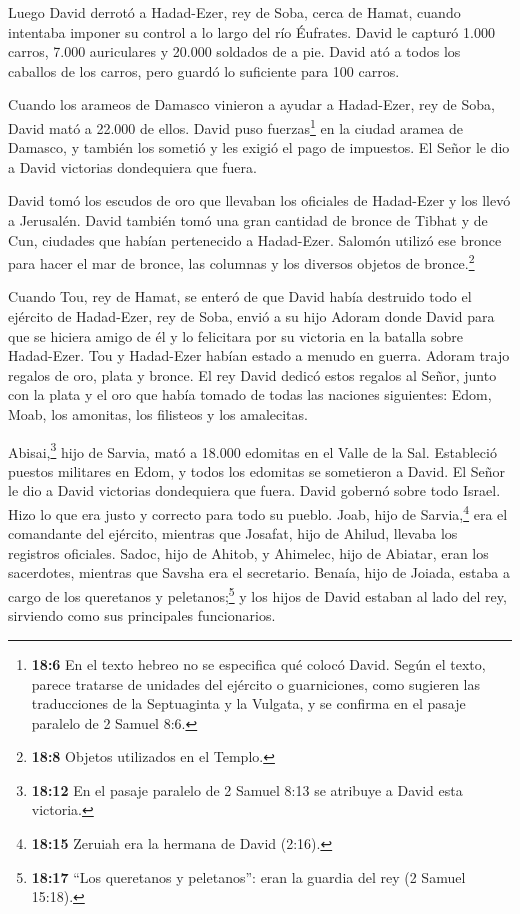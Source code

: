  Luego David derrotó a Hadad-Ezer, rey de Soba, cerca de
Hamat, cuando intentaba imponer su control a lo largo del río Éufrates.
 David le capturó 1.000 carros, 7.000 auriculares y 20.000
soldados de a pie. David ató a todos los caballos de los carros, pero
guardó lo suficiente para 100 carros.

 Cuando los arameos de Damasco vinieron a ayudar a
Hadad-Ezer, rey de Soba, David mató a 22.000 de ellos. 
David puso fuerzas\footnote{\textbf{18:6} En el texto hebreo no se
  especifica qué colocó David. Según el texto, parece tratarse de
  unidades del ejército o guarniciones, como sugieren las traducciones
  de la Septuaginta y la Vulgata, y se confirma en el pasaje paralelo de
  2 Samuel 8:6.} en la ciudad aramea de Damasco, y también los sometió y
les exigió el pago de impuestos. El Señor le dio a David victorias
dondequiera que fuera.

 David tomó los escudos de oro que llevaban los oficiales de
Hadad-Ezer y los llevó a Jerusalén.  David también tomó una
gran cantidad de bronce de Tibhat y de Cun, ciudades que habían
pertenecido a Hadad-Ezer. Salomón utilizó ese bronce para hacer el mar
de bronce, las columnas y los diversos objetos de bronce.\footnote{\textbf{18:8}
  Objetos utilizados en el Templo.}

 Cuando Tou, rey de Hamat, se enteró de que David había
destruido todo el ejército de Hadad-Ezer, rey de Soba, 
envió a su hijo Adoram donde David para que se hiciera amigo de él y lo
felicitara por su victoria en la batalla sobre Hadad-Ezer. Tou y
Hadad-Ezer habían estado a menudo en guerra. Adoram trajo regalos de
oro, plata y bronce.  El rey David dedicó estos regalos al
Señor, junto con la plata y el oro que había tomado de todas las
naciones siguientes: Edom, Moab, los amonitas, los filisteos y los
amalecitas.

 Abisai,\footnote{\textbf{18:12} En el pasaje paralelo de 2
  Samuel 8:13 se atribuye a David esta victoria.} hijo de Sarvia, mató a
18.000 edomitas en el Valle de la Sal.  Estableció puestos
militares en Edom, y todos los edomitas se sometieron a David. El Señor
le dio a David victorias dondequiera que fuera.  David
gobernó sobre todo Israel. Hizo lo que era justo y correcto para todo su
pueblo.  Joab, hijo de Sarvia,\footnote{\textbf{18:15}
  Zeruiah era la hermana de David (2:16).} era el comandante del
ejército, mientras que Josafat, hijo de Ahilud, llevaba los registros
oficiales.  Sadoc, hijo de Ahitob, y Ahimelec, hijo de
Abiatar, eran los sacerdotes, mientras que Savsha era el secretario.
 Benaía, hijo de Joiada, estaba a cargo de los queretanos y
peletanos;\footnote{\textbf{18:17} ``Los queretanos y peletanos'': eran
  la guardia del rey (2 Samuel 15:18).} y los hijos de David estaban al
lado del rey, sirviendo como sus principales funcionarios.

